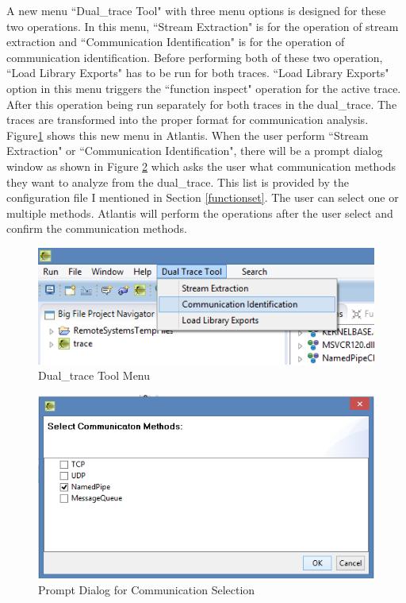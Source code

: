 A new menu ``Dual\_trace Tool" with three menu options is designed for these two operations. In this menu, ``Stream Extraction" is for the operation of stream extraction and ``Communication Identification" is for the operation of communication identification. Before performing both of these two operation, ``Load Library Exports" has to be run for both traces. ``Load Library Exports" option in this menu triggers the ``function inspect" operation for the active trace. After this operation being run separately for both traces in the dual\_trace. The traces are transformed into the proper format for communication analysis. Figure\ref{dualtracetoolmenu} shows this new menu in Atlantis. When the user perform ``Stream Extraction" or ``Communication Identification", there will be a prompt dialog window as shown in Figure \ref{methods} which asks the user what communication methods they want to analyze from the dual\_trace. This list is provided by the configuration file I mentioned in Section \ref{functionset}. The user can select one or multiple methods. Atlantis will perform the operations after the user select and confirm the communication methods.

\begin{figure}[H]
\centerline{\includegraphics{Figures/dualtracetoolmenu}}
 \caption{Dual\_trace Tool Menu}
\label{dualtracetoolmenu}
\end{figure}

\begin{figure}[H]
\centerline{\includegraphics[scale=0.8]{Figures/methods}}
 \caption{Prompt Dialog for Communication Selection}
\label{methods}
\end{figure}



